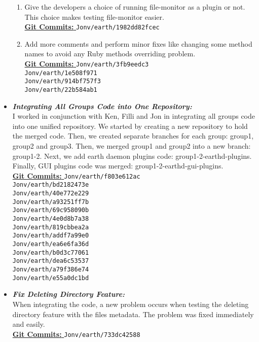 \begin{itemize}
\begin{enumerate}
\item Give the developers a choice of running file-monitor as a plugin or not. This choice makes testing file-monitor easier. \\
\underline{\textbf{Git Commits: }} \texttt{Jonv/earth/1982dd82fcec}

\item Add more comments and perform minor fixes like changing some method names to avoid any Ruby methods overriding problem.\\ 
\underline{\textbf{Git Commits: }} \texttt{Jonv/earth/3fb9eedc3} \\
\texttt{Jonv/earth/1e508f971} \\
\texttt{Jonv/earth/914bf757f3} \\
\texttt{Jonv/earth/22b584ab1}
\end{enumerate}
	\item \textit{\textbf{Integrating All Groups Code into One Repository:}}\\
I worked in conjunction with Ken, Filli and Jon in integrating all groups code into one unified repository. We started by creating a new repository to hold the merged code. Then, we created separate branches for each group: group1, group2 and group3. Then, we merged group1 and group2 into a new branch: group1-2. Next, we add earth daemon plugins code: group1-2-earthd-plugins. Finally, GUI plugins code was merged: group1-2-earthd-gui-plugins.\\
\underline{\textbf{Git Commits: }} \texttt{Jonv/earth/f803e612ac} \\ 
\texttt{Jonv/earth/bd2182473e} \\ 
\texttt{Jonv/earth/40e772e229} \\ 
\texttt{Jonv/earth/a93251ff7b} \\ 
\texttt{Jonv/earth/69c958090b} \\ 
\texttt{Jonv/earth/4e0d8b7a38} \\ 
\texttt{Jonv/earth/819cbbea2a} \\ 
\texttt{Jonv/earth/addf7a99e0} \\ 
\texttt{Jonv/earth/ea6e6fa36d} \\
\texttt{Jonv/earth/b0d3c77061} \\
\texttt{Jonv/earth/dea6c53537} \\ 
\texttt{Jonv/earth/a79f386e74} \\ 
\texttt{Jonv/earth/e55a0dc1bd}

\item \textit{\textbf{Fix Deleting Directory Feature:}}\\
When integrating the code, a new problem occurs when testing the deleting directory feature with the files metadata. The problem was fixed immediately and easily.\\
\underline{\textbf{Git Commits: }} \texttt{Jonv/earth/733dc42588}
\end{itemize}

